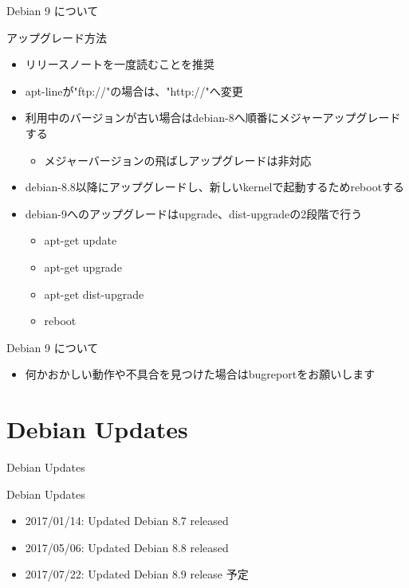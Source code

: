 \begin{frame}{Debian 9 について}%

アップグレード方法
\begin{itemize}
\item リリースノートを一度読むことを推奨
\item apt-lineが"ftp://"の場合は、"http://"へ変更
\item 利用中のバージョンが古い場合はdebian-8へ順番にメジャーアップグレードする
  \begin{itemize}  
  \item メジャーバージョンの飛ばしアップグレードは非対応
  \end{itemize}
\item debian-8.8以降にアップグレードし、新しいkernelで起動するためrebootする
\item debian-9へのアップグレードはupgrade、dist-upgradeの2段階で行う
  \begin{itemize}
  \item apt-get update
  \item apt-get upgrade
  \item apt-get dist-upgrade
  \item reboot
  \end{itemize}
\end{itemize}

\end{frame}


\begin{frame}{Debian 9 について}%
  \begin{itemize}
    \item 何かおかしい動作や不具合を見つけた場合はbugreportをお願いします
  \end{itemize}
\end{frame}


\section{Debian Updates}
\begin{frame}\begin{center}\Huge{Debian Updates}\end{center}\end{frame}


\begin{frame}{Debian Updates}%

\begin{itemize}[<+->]
\item 2017/01/14:  Updated Debian 8.7 released\\
\item 2017/05/06:  Updated Debian 8.8 released\\
\item 2017/07/22:  Updated Debian 8.9 release 予定\\
\ \\
   \small{}

\end{itemize}

\end{frame}



